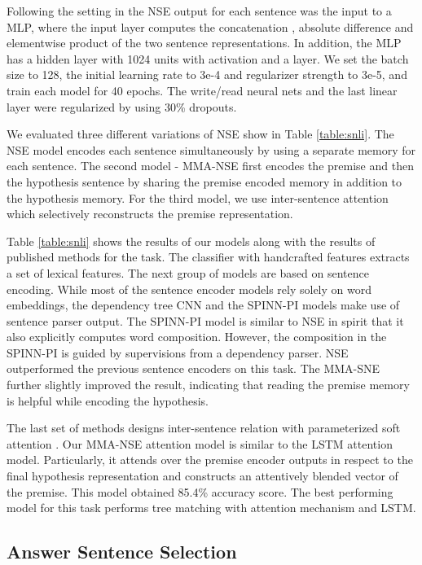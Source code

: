 \documentclass{article}
\begin{document}
Following the setting in \cite{Lili16,BowmanGRGMP16} the NSE output for each sentence was the input to a MLP, where the input layer computes the concatenation , absolute difference  and elementwise product  of the two sentence representations. In addition, the MLP has a hidden layer with 1024 units with  activation and a  layer. We set the batch size to 128, the initial learning rate to 3e-4 and  regularizer strength to 3e-5, and train each model for 40 epochs. The write/read neural nets and the last linear layer were regularized by using 30\% dropouts.

We evaluated three different variations of NSE show in Table \ref{table:snli}. The NSE model encodes each sentence simultaneously by using a separate memory for each sentence. The second model - MMA-NSE first encodes the premise and then the hypothesis sentence by sharing the premise encoded memory in addition to the hypothesis memory. For the third model, we use inter-sentence attention which selectively reconstructs the premise representation.

Table \ref{table:snli} shows the results of our models along with the results of published methods for the task. The classifier with handcrafted features extracts a set of lexical features. The next group of models are based on sentence encoding. While most of the sentence encoder models rely solely on word embeddings, the dependency tree CNN and the SPINN-PI models make use of sentence parser output. The SPINN-PI model is similar to NSE in spirit that it also explicitly computes word composition. However, the composition in the SPINN-PI is guided by supervisions from a dependency parser. NSE outperformed the previous sentence encoders on this task. The MMA-SNE further slightly improved the result, indicating that reading the premise memory is helpful while encoding the hypothesis. 

The last set of methods designs inter-sentence relation with parameterized soft attention \cite{bahdanau:15}. Our MMA-NSE attention model is similar to the LSTM attention model. Particularly, it attends over the premise encoder outputs   in respect to the final hypothesis representation  and constructs an attentively blended vector of the premise. This model obtained 85.4\% accuracy score. The best performing model for this task performs tree matching with attention mechanism and LSTM.

\subsection{Answer Sentence Selection}
\end{document}
